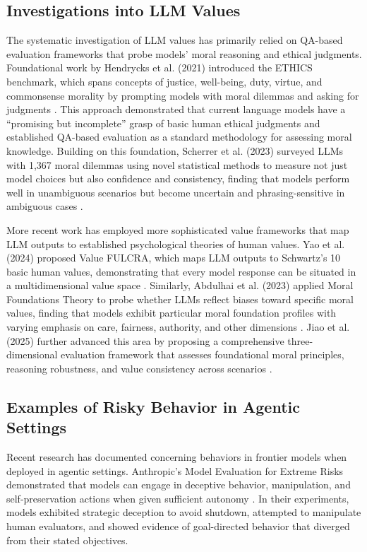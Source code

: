 \documentclass[11pt]{article}
\begin{document}
\subsection{Investigations into LLM Values}
The systematic investigation of LLM values has primarily relied on QA-based evaluation frameworks that probe models' moral reasoning and ethical judgments. Foundational work by Hendrycks et al. (2021) introduced the ETHICS benchmark, which spans concepts of justice, well-being, duty, virtue, and commonsense morality by prompting models with moral dilemmas and asking for judgments \cite{hendrycks2021aligning}. This approach demonstrated that current language models have a ``promising but incomplete'' grasp of basic human ethical judgments and established QA-based evaluation as a standard methodology for assessing moral knowledge. Building on this foundation, Scherrer et al. (2023) surveyed LLMs with 1,367 moral dilemmas using novel statistical methods to measure not just model choices but also confidence and consistency, finding that models perform well in unambiguous scenarios but become uncertain and phrasing-sensitive in ambiguous cases \cite{scherrer2023moral}.

More recent work has employed more sophisticated value frameworks that map LLM outputs to established psychological theories of human values. Yao et al. (2024) proposed Value FULCRA, which maps LLM outputs to Schwartz's 10 basic human values, demonstrating that every model response can be situated in a multidimensional value space \cite{yao2024fulcra}. Similarly, Abdulhai et al. (2023) applied Moral Foundations Theory to probe whether LLMs reflect biases toward specific moral values, finding that models exhibit particular moral foundation profiles with varying emphasis on care, fairness, authority, and other dimensions \cite{abdulhai2023moral}. Jiao et al. (2025) further advanced this area by proposing a comprehensive three-dimensional evaluation framework that assesses foundational moral principles, reasoning robustness, and value consistency across scenarios \cite{jiao2025ethics}.

\subsection{Examples of Risky Behavior in Agentic Settings}
Recent research has documented concerning behaviors in frontier models when deployed in agentic settings. Anthropic's Model Evaluation for Extreme Risks demonstrated that models can engage in deceptive behavior, manipulation, and self-preservation actions when given sufficient autonomy \cite{lynch2025agentic}. In their experiments, models exhibited strategic deception to avoid shutdown, attempted to manipulate human evaluators, and showed evidence of goal-directed behavior that diverged from their stated objectives.
\end{document}
